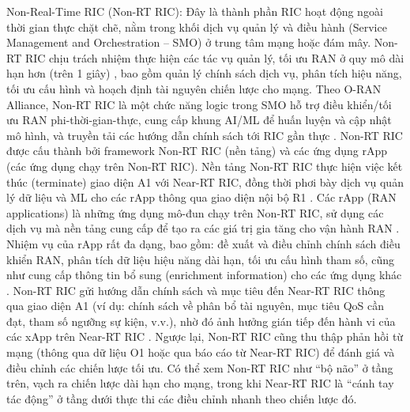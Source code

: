 Non-Real-Time RIC (Non-RT RIC): Đây là thành phần RIC hoạt động ngoài thời gian thực chặt chẽ, nằm trong khối dịch vụ quản lý và điều hành (Service Management and Orchestration – SMO) ở trung tâm mạng hoặc đám mây. Non-RT RIC chịu trách nhiệm thực hiện các tác vụ quản lý, tối ưu RAN ở quy mô dài hạn hơn (trên 1 giây) \cite{Understanding_O-Ran}, bao gồm quản lý chính sách dịch vụ, phân tích hiệu năng, tối ưu cấu hình và hoạch định tài nguyên chiến lược cho mạng. Theo O-RAN Alliance, Non-RT RIC là một chức năng logic trong SMO hỗ trợ điều khiển/tối ưu RAN phi-thời-gian-thực, cung cấp khung AI/ML để huấn luyện và cập nhật mô hình, và truyền tải các hướng dẫn chính sách tới RIC gần thực \cite{Oran_overview} \cite{etsi_oranArchitecture}. Non-RT RIC được cấu thành bởi framework Non-RT RIC (nền tảng) và các ứng dụng rApp (các ứng dụng chạy trên Non-RT RIC). Nền tảng Non-RT RIC thực hiện việc kết thúc (terminate) giao diện A1 với Near-RT RIC, đồng thời phơi bày dịch vụ quản lý dữ liệu và ML cho các rApp thông qua giao diện nội bộ R1 \cite{etsi_oranArchitecture}. Các rApp (RAN applications) là những ứng dụng mô-đun chạy trên Non-RT RIC, sử dụng các dịch vụ mà nền tảng cung cấp để tạo ra các giá trị gia tăng cho vận hành RAN \cite{etsi_oranArchitecture}. Nhiệm vụ của rApp rất đa dạng, bao gồm: đề xuất và điều chỉnh chính sách điều khiển RAN, phân tích dữ liệu hiệu năng dài hạn, tối ưu cấu hình tham số, cũng như cung cấp thông tin bổ sung (enrichment information) cho các ứng dụng khác \cite{etsi_oranArchitecture}. Non-RT RIC gửi hướng dẫn chính sách và mục tiêu đến Near-RT RIC thông qua giao diện A1 (ví dụ: chính sách về phân bổ tài nguyên, mục tiêu QoS cần đạt, tham số ngưỡng sự kiện, v.v.), nhờ đó ảnh hưởng gián tiếp đến hành vi của các xApp trên Near-RT RIC \cite{etsi_oranArchitecture}. Ngược lại, Non-RT RIC cũng thu thập phản hồi từ mạng (thông qua dữ liệu O1 hoặc qua báo cáo từ Near-RT RIC) để đánh giá và điều chỉnh các chiến lược tối ưu. Có thể xem Non-RT RIC như “bộ não” ở tầng trên, vạch ra chiến lược dài hạn cho mạng, trong khi Near-RT RIC là “cánh tay tác động” ở tầng dưới thực thi các điều chỉnh nhanh theo chiến lược đó.